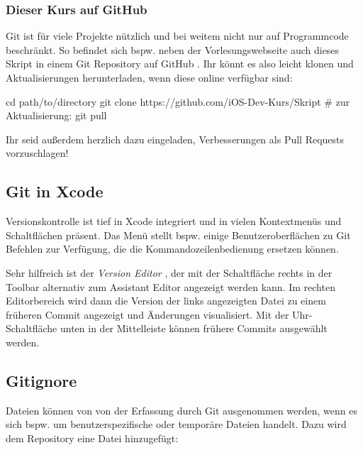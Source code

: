 \documentclass[parskip=half, final]{scrreprt}
\begin{document}
\subsubsection{Dieser Kurs auf GitHub}

Git ist für viele Projekte nützlich und bei weitem nicht nur auf Programmcode beschränkt. So befindet sich bspw. neben der Vorlesungswebseite auch dieses Skript in einem Git Repository auf GitHub . Ihr könnt es also leicht klonen und Aktualisierungen herunterladen, wenn diese online verfügbar sind:

\begin{shcode}
cd path/to/directory
git clone https://github.com/iOS-Dev-Kurs/Skript
# zur Aktualisierung:
git pull
\end{shcode}

Ihr seid außerdem herzlich dazu eingeladen, Verbesserungen als Pull Requests vorzuschlagen!


\subsection{Git in Xcode} 

Versionskontrolle ist tief in Xcode integriert und in vielen Kontextmenüs und Schaltflächen präsent. Das Menü  stellt bspw. einige Benutzeroberflächen zu Git Befehlen zur Verfügung, die die Kommandozeilenbedienung ersetzen können.

Sehr hilfreich ist der \emph{Version Editor} , der mit der Schaltfläche rechts in der Toolbar alternativ zum Assistant Editor angezeigt werden kann. Im rechten Editorbereich wird dann die Version der links angezeigten Datei zu einem früheren Commit angezeigt und Änderungen visualisiert. Mit der Uhr-Schaltfläche unten in der Mittelleiste können frühere Commits ausgewählt werden.


\subsection{Gitignore}

Dateien können von von der Erfassung durch Git ausgenommen werden, wenn es sich bspw. um benutzerspezifische oder temporäre Dateien handelt. Dazu wird dem Repository eine  Datei hinzugefügt:
\end{document}
